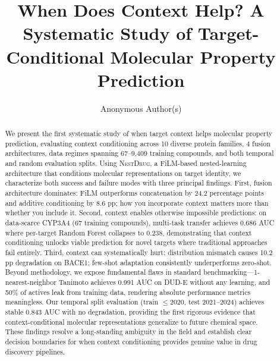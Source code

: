 \documentclass[sigconf,anonymous]{acmart}
\newcommand{\methodname}{\textsc{NestDrug}}
\begin{document}
\title{When Does Context Help? A Systematic Study of Target-Conditional Molecular Property Prediction}

\author{Anonymous Author(s)}

\begin{abstract}
We present the first systematic study of when target context helps molecular property prediction, evaluating context conditioning across 10 diverse protein families, 4 fusion architectures, data regimes spanning 67--9,409 training compounds, and both temporal and random evaluation splits. Using \methodname{}, a FiLM-based nested-learning architecture that conditions molecular representations on target identity, we characterize both success and failure modes with three principal findings. First, fusion architecture dominates: FiLM outperforms concatenation by 24.2 percentage points and additive conditioning by 8.6 pp; how you incorporate context matters more than whether you include it. Second, context enables otherwise impossible predictions: on data-scarce CYP3A4 (67 training compounds), multi-task transfer achieves 0.686 AUC where per-target Random Forest collapses to 0.238, demonstrating that context conditioning unlocks viable prediction for novel targets where traditional approaches fail entirely. Third, context can systematically hurt: distribution mismatch causes 10.2 pp degradation on BACE1; few-shot adaptation consistently underperforms zero-shot. Beyond methodology, we expose fundamental flaws in standard benchmarking---1-nearest-neighbor Tanimoto achieves 0.991 AUC on DUD-E without any learning, and 50\% of actives leak from training data, rendering absolute performance metrics meaningless. Our temporal split evaluation (train $\leq$2020, test 2021--2024) achieves stable 0.843 AUC with no degradation, providing the first rigorous evidence that context-conditional molecular representations generalize to future chemical space. These findings resolve a long-standing ambiguity in the field and establish clear decision boundaries for when context conditioning provides genuine value in drug discovery pipelines.
\end{abstract}

\begin{CCSCONCEPTSTEST}
\end{CCSCONCEPTSTEST}
\end{document}
